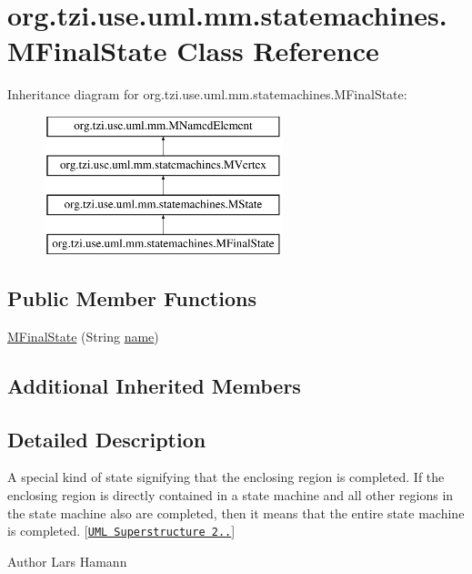 \hypertarget{classorg_1_1tzi_1_1use_1_1uml_1_1mm_1_1statemachines_1_1_m_final_state}{\section{org.\-tzi.\-use.\-uml.\-mm.\-statemachines.\-M\-Final\-State Class Reference}
\label{classorg_1_1tzi_1_1use_1_1uml_1_1mm_1_1statemachines_1_1_m_final_state}
}
Inheritance diagram for org.\-tzi.\-use.\-uml.\-mm.\-statemachines.\-M\-Final\-State\-:\begin{figure}[H]
\begin{center}
\leavevmode
\includegraphics[height=4.000000cm]{classorg_1_1tzi_1_1use_1_1uml_1_1mm_1_1statemachines_1_1_m_final_state}
\end{center}
\end{figure}
\subsection*{Public Member Functions}
\begin{DoxyCompactItemize}
\item 
\hyperlink{classorg_1_1tzi_1_1use_1_1uml_1_1mm_1_1statemachines_1_1_m_final_state_af198232fa826f613f08c92e408052905}{M\-Final\-State} (String \hyperlink{classorg_1_1tzi_1_1use_1_1uml_1_1mm_1_1statemachines_1_1_m_vertex_a9bb884a76140732039ff1fbf631b6575}{name})
\end{DoxyCompactItemize}
\subsection*{Additional Inherited Members}


\subsection{Detailed Description}
A special kind of state signifying that the enclosing region is completed. If the enclosing region is directly contained in a state machine and all other regions in the state machine also are completed, then it means that the entire state machine is completed. \mbox{[}\href{http://www.omg.org/spec/UML/}{\tt U\-M\-L Superstructure 2..}\mbox{]} \begin{DoxyAuthor}{Author}
Lars Hamann 
\end{DoxyAuthor}


